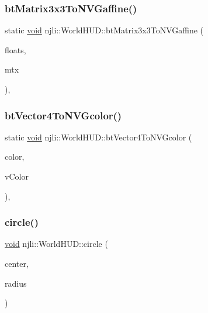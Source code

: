 \subsubsection{\texorpdfstring{bt\+Matrix3x3\+To\+N\+V\+Gaffine()}{btMatrix3x3ToNVGaffine()}}
{\footnotesize\ttfamily static \mbox{\hyperlink{_thread_8h_af1e856da2e658414cb2456cb6f7ebc66}{void}} njli\+::\+World\+H\+U\+D\+::bt\+Matrix3x3\+To\+N\+V\+Gaffine (\begin{DoxyParamCaption}\item[{\mbox{\hyperlink{_util_8h_a5f6906312a689f27d70e9d086649d3fd}{f32}} $\ast$}]{floats,  }\item[{const bt\+Matrix3x3 \&}]{mtx }\end{DoxyParamCaption})\hspace{0.3cm}{\ttfamily [static]}, {\ttfamily [protected]}}

\mbox{\label{classnjli_1_1_world_h_u_d_aabaa1466701198abf39dd94cb9109b2f}} 
\subsubsection{\texorpdfstring{bt\+Vector4\+To\+N\+V\+Gcolor()}{btVector4ToNVGcolor()}}
{\footnotesize\ttfamily static \mbox{\hyperlink{_thread_8h_af1e856da2e658414cb2456cb6f7ebc66}{void}} njli\+::\+World\+H\+U\+D\+::bt\+Vector4\+To\+N\+V\+Gcolor (\begin{DoxyParamCaption}\item[{N\+V\+Gcolor \&}]{color,  }\item[{const bt\+Vector4 \&}]{v\+Color }\end{DoxyParamCaption})\hspace{0.3cm}{\ttfamily [static]}, {\ttfamily [protected]}}

\mbox{\label{classnjli_1_1_world_h_u_d_a3170986b281a79fc800322102ab17f51}} 
\subsubsection{\texorpdfstring{circle()}{circle()}\hspace{0.1cm}{\footnotesize\ttfamily [1/2]}}
{\footnotesize\ttfamily \mbox{\hyperlink{_thread_8h_af1e856da2e658414cb2456cb6f7ebc66}{void}} njli\+::\+World\+H\+U\+D\+::circle (\begin{DoxyParamCaption}\item[{const bt\+Vector2 \&}]{center,  }\item[{\mbox{\hyperlink{_util_8h_a5f6906312a689f27d70e9d086649d3fd}{f32}}}]{radius }\end{DoxyParamCaption})}


